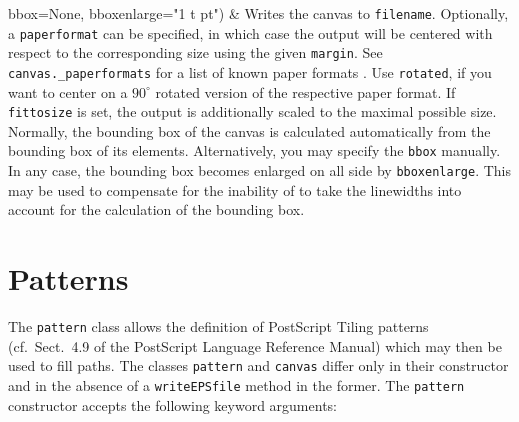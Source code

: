 \begin{tabularx}
{      \newline\phantom{writeEPSfile(}bbox=None,
      \newline\phantom{writeEPSfile(}bboxenlarge="1 t pt")} &
  Writes the canvas to \texttt{filename}. Optionally, a
  \texttt{paperformat} can be specified, in which case the output will
  be centered with respect to the corresponding size using the given
  \texttt{margin}. See \texttt{canvas.\_paperformats} for a list of
  known paper formats . Use \texttt{rotated}, if you want to center on
  a $90^\circ$ rotated version of the respective paper format. If
  \texttt{fittosize} is set, the output is additionally scaled to the
  maximal possible size. Normally, the bounding box of the canvas is 
  calculated automatically from the bounding box of its elements.
  Alternatively, you may specify the \texttt{bbox} manually. In any
  case, the bounding box becomes enlarged on all side by
  \texttt{bboxenlarge}. This may be used to compensate for the
  inability of \PyX{} to take the linewidths into account for the
  calculation of the bounding box.
\end{tabularx} 
\medskip

\section{Patterns}

The \texttt{pattern} class allows the definition of PostScript Tiling
patterns (cf.\ Sect.~4.9 of the PostScript Language Reference Manual)
which may then be used to fill paths. The classes \texttt{pattern} and
\texttt{canvas} differ only in their constructor and in the absence of
a \texttt{writeEPSfile} method in the former. The \texttt{pattern}
constructor accepts the following keyword arguments:


